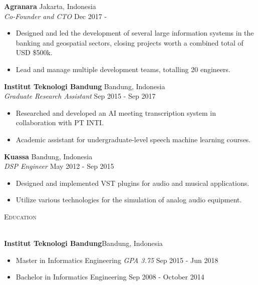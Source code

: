 \documentclass[a4paper]{article}
\newcommand{\lineunder} {
    \vspace*{-8pt} \\
    \hspace*{-18pt} \hrulefill \\
}
\newcommand{\header} [1] {
    {\hspace*{-18pt}\vspace*{6pt} \textsc{#1}}
    \vspace*{-6pt} \lineunder
}
\begin{document}
\vspace{-2mm}
\textbf{Agranara} \hfill Jakarta, Indonesia\\
\textit{Co-Founder and CTO} \hfill Dec 2017 -\\
\vspace{-3mm}
\begin{itemize} \itemsep -2pt
  \item Designed and led the development of several large information systems in
    the banking and geospatial sectors, closing projects worth a combined total of
    USD \$500k.
  \item Lead and manage multiple development teams, totalling 20 engineers.
\end{itemize}

\vspace{-2mm}
\textbf{Institut Teknologi Bandung} \hfill Bandung, Indonesia\\
\textit{Graduate Research Assistant} \hfill Sep 2015 - Sep 2017\\
\vspace{-3mm}
\begin{itemize} \itemsep -2pt
  \item Researched and developed an AI meeting transcription system in
    collaboration with PT INTI.
  \item Academic assistant for undergraduate-level speech machine learning courses.
\end{itemize}

\vspace{-2mm}
\textbf{Kuassa} \hfill Bandung, Indonesia\\
\textit{DSP Engineer} \hfill May 2012 - Sep 2015\\
\vspace{-3mm}
\begin{itemize} \itemsep -2pt
  \item Designed and implemented VST plugins for audio and musical applications.
  \item Utilize various technologies for the simulation of analog audio
    equipment.
\end{itemize}

\header{Education}
\vspace{1mm}

\textbf{Institut Teknologi Bandung}\hfill Bandung, Indonesia\\
\vspace{-3mm}
\begin{itemize} \itemsep -2pt
  \item Master in Informatics Engineering \textit{GPA 3.75} \hfill Sep 2015 - Jun 2018
  \item Bachelor in Informatics Engineering \hfill Sep 2008 - October 2014
\end{itemize}
\end{document}
